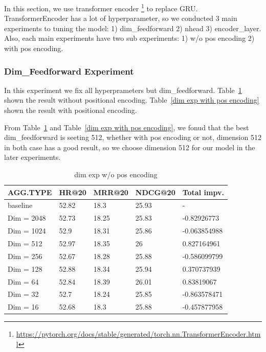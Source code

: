 \documentclass{article}
\begin{document}
In this section, we use transformer encoder
\footnote{\url{https://pytorch.org/docs/stable/generated/torch.nn.TransformerEncoder.html}}
to replace GRU.
TransformerEncoder has a lot of hyperparameter, so we conducted
3 main experiments to tuning the model:
1) dim\_feedforward 2) nhead 3) encoder\_layer.
Also, each main experiments have two sub experiments:
1) w/o pos encoding 2) with pos encoding.

\subsubsection{Dim\_Feedforward Experiment}

In this experiment we fix all hyperprameters but dim\_feedforward.
Table~\ref{dim exp w/o pos encoding} shown the result without
positional encoding.
Table~\ref{dim exp with pos encoding} shown the result with positional encoding.

From Table~\ref{dim exp w/o pos encoding} and Table~\ref{dim exp with pos encoding},
we fonud that the best dim\_feedforward is seeting 512,
whether with pos encoding or not, dimension 512 in both case has a good result,
so we choose dimension 512 for our model in the later experiments.

\begin{table}
    \caption{dim exp w/o pos encoding}
    \label{dim exp w/o pos encoding}
    \centering
    \begin{tabular}{lllll}
        \toprule
        AGG.TYPE   & HR@20 & MRR@20 & NDCG@20 & Total impv.  \\
        \midrule
        baseline   & 52.82 & 18.3   & 25.93   & -            \\
        Dim = 2048 & 52.73 & 18.25  & 25.83   & -0.82926773  \\
        Dim = 1024 & 52.9  & 18.31  & 25.86   & -0.063854988 \\
        Dim = 512  & 52.97 & 18.35  & 26      & 0.827164961  \\
        Dim = 256  & 52.67 & 18.28  & 25.88   & -0.586099799 \\
        Dim = 128  & 52.88 & 18.34  & 25.94   & 0.370737939  \\
        Dim = 64   & 52.84 & 18.39  & 26.01   & 0.83819067   \\
        Dim = 32   & 52.7  & 18.24  & 25.85   & -0.863578471 \\
        Dim = 16   & 52.68 & 18.3   & 25.88   & -0.457877958 \\
        \bottomrule
    \end{tabular}
\end{table}
\end{document}
